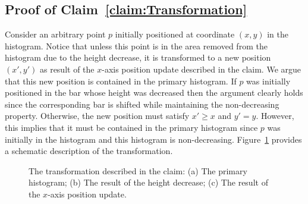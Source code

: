 \documentclass[11pt]{article}
\theoremstyle{plain}
\theoremstyle{definition}
\begin{document}
\subsection{Proof of Claim~\ref{claim:Transformation}} \label{appsubsec:TransformationProof}
Consider an arbitrary point $p$ initially positioned at coordinate
$(x,y)$ in the histogram. Notice that unless this point is in the
area removed from the histogram due to the height decrease, it is
transformed to a new position $(x',y')$ as result of the $x$-axis
position update described in the claim. We argue that this new
position is contained in the primary histogram. If $p$ was
initially positioned in the bar whose height was decreased then
the argument clearly holds since the corresponding bar is shifted
while maintaining the non-decreasing property. Otherwise, the new
position must satisfy $x' \geq x$ and $y' = y$. However, this
implies that it must be contained in the primary histogram since
$p$ was initially in the histogram and this histogram is
non-decreasing. Figure~\ref{fig:Transformation} provides a
schematic description of the transformation.
\begin{figure}[!hbt]
\centerline{  }
\caption{The transformation described in the claim: (a) The
primary histogram; (b) The result of the height decrease; (c) The
result of the $x$-axis position update.}
\label{fig:Transformation}
\end{figure}
\end{document}
